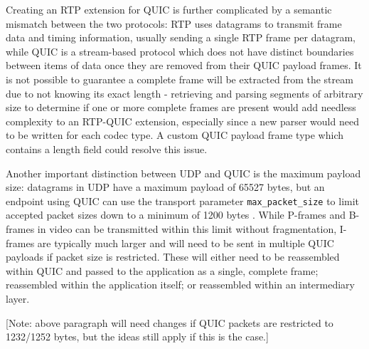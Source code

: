 \documentclass{mprop}
\begin{document}
Creating an RTP extension for QUIC is further complicated by a semantic mismatch between the two protocols: RTP uses datagrams to transmit frame data and timing information, usually sending a single RTP frame per datagram, while QUIC is a stream-based protocol which does not have distinct boundaries between items of data once they are removed from their QUIC payload frames. It is not possible to guarantee a complete frame will be extracted from the stream due to not knowing its exact length - retrieving and parsing segments of arbitrary size to determine if one or more complete frames are present would add needless complexity to an RTP-QUIC extension, especially since a new parser would need to be written for each codec type. A custom QUIC payload frame type which contains a length field could resolve this issue.

Another important distinction between UDP and QUIC is the maximum payload size: datagrams in UDP have a maximum payload of 65527 bytes, but an endpoint using QUIC can use the transport parameter \texttt{max\_packet\_size} to limit accepted packet sizes down to a minimum of 1200 bytes \cite{quic-transport-16}. While P-frames and B-frames in video can be transmitted within this limit without fragmentation, I-frames are typically much larger and will need to be sent in multiple QUIC payloads if packet size is restricted. These will either need to be reassembled within QUIC and passed to the application as a single, complete frame; reassembled within the application itself; or reassembled within an intermediary layer.

[Note: above paragraph will need changes if QUIC packets are restricted to 1232/1252 bytes, but the ideas still apply if this is the case.]



\end{document}
